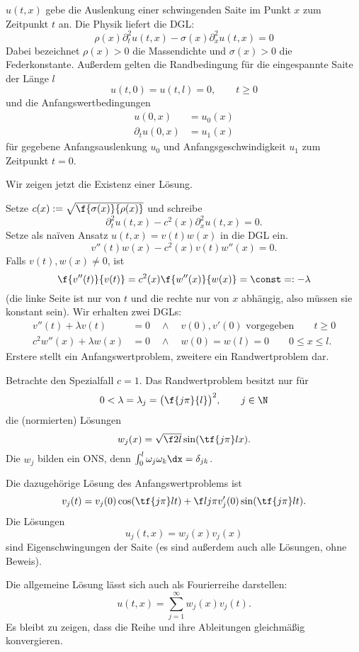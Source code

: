 \setcounter{thm}{4} %
\begin{ex} %
	$u(t,x)$ gebe die Auslenkung einer schwingenden Saite im Punkt $x$ zum Zeitpunkt $t$ an.
	Die Physik liefert die DGL:
	\[
		\rho(x) \partial_t^2 u(t,x) - \sigma(x) \partial_x^2 u(t,x) = 0
	\]
	Dabei bezeichnet $\rho(x) > 0$ die Massendichte und $\sigma(x) > 0$ die Federkonstante.
	Außerdem gelten die Randbedingung für die eingespannte Saite der Länge $l$
	\[
		u(t,0) = u(t,l) = 0,
		\qquad t \ge 0
	\]
	und die Anfangswertbedingungen
	\begin{align*}
		u(0,x) &= u_0(x) \\
		\partial_t u(0,x) &= u_1(x)
	\end{align*}
	für gegebene Anfangsauslenkung $u_0$ und Anfangsgeschwindigkeit $u_1$ zum Zeitpunkt $t = 0$.

	Wir zeigen jetzt die Existenz einer Lösung.

	Setze $c(x) := \sqrt{\f {\sigma(x)}{\rho(x)}}$ und schreibe
	\[
		\partial_t^2 u(t,x) - c^2(x) \partial_x^2 u(t,x) = 0.
	\]
	Setze als naïven Ansatz $u(t,x) = v(t)w(x)$ in die DGL ein.
	\[
		v''(t) w(x) - c^2(x) v(t) w''(x) = 0.
	\]
	Falls $v(t),w(x) \neq 0$, ist
	\[
		\f {v''(t)}{v(t)} = c^2(x) \f {w''(x)}{w(x)} = \const =: - \lambda
	\]
	(die linke Seite ist nur von $t$ und die rechte nur von $x$ abhängig, also müssen sie konstant sein).
	Wir erhalten zwei DGLs:
	\begin{align*}
		v''(t) + \lambda v(t) &= 0 \quad \land  \quad v(0), v'(0) \text{ vorgegeben} \qquad t \ge 0 \\
		c^2 w''(x) + \lambda w(x) &= 0 \quad \land \quad w(0) = w(l) = 0 \qquad 0 \le x \le l.
	\end{align*}
	Erstere stellt ein Anfangswertproblem, zweitere ein Randwertproblem dar.

	Betrachte den Spezialfall $c = 1$.
	Das Randwertproblem besitzt nur für
	\[
		0 < \lambda = \lambda_j = \big( \f {j\pi}{l} \big)^2,
		\qquad j\in\N
	\]
	die (normierten) Lösungen
	\[
		w_j(x) = \sqrt{\f 2l} \sin( \tf {j\pi}l x).
	\]
	Die $w_j$ bilden ein ONS, denn $\int_{0}^l \omega_j \omega_k \dx = \delta_{jk}$.

	Die dazugehörige Lösung des Anfangswertproblems ist
	\[
		v_j(t) = v_j(0) \cos(\tf {j\pi}l t) + \f l{j\pi} v_j'(0) \sin(\tf{j\pi}l t).
	\]
	Die Lösungen
	\[
		u_j(t,x) = w_j(x) v_j(x)
	\]
	sind Eigenschwingungen der Saite (es sind außerdem auch alle Lösungen, ohne Beweis).
	
	Die allgemeine Lösung lässt sich auch als Fourierreihe darstellen:
	\[
		u(t,x) = \sum_{j=1}^\infty w_j(x) v_j(t).
	\]
	Es bleibt zu zeigen, dass die Reihe und ihre Ableitungen gleichmäßig konvergieren.
\end{ex}


